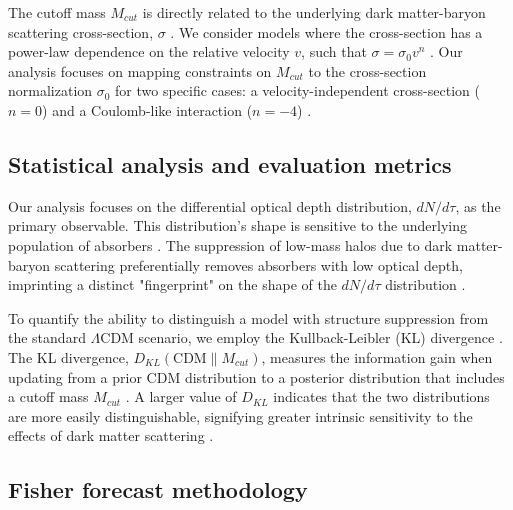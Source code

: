 \documentclass[]{article}
\begin{document}
The cutoff mass $M_{cut}$ is directly related to the underlying dark matter-baryon scattering cross-section, $\sigma$ . We consider models where the cross-section has a power-law dependence on the relative velocity $v$, such that $\sigma = \sigma_0 v^n$ \citep{Mahdawi_2018,Rahimieh_2025}. Our analysis focuses on mapping constraints on $M_{cut}$ to the cross-section normalization $\sigma_0$ for two specific cases: a velocity-independent cross-section ($n=0$) and a Coulomb-like interaction ($n=-4$) \citep{Mahdawi_2018,Rahimieh_2025}.

\subsection{Statistical analysis and evaluation metrics}

Our analysis focuses on the differential optical depth distribution, $dN/d\tau$, as the primary observable. This distribution's shape is sensitive to the underlying population of absorbers \citep{filipp2026lsststronglensingsystems}. The suppression of low-mass halos due to dark matter-baryon scattering preferentially removes absorbers with low optical depth, imprinting a distinct "fingerprint" on the shape of the $dN/d\tau$ distribution .

To quantify the ability to distinguish a model with structure suppression from the standard $\Lambda$CDM scenario, we employ the Kullback-Leibler (KL) divergence \citep{Hee_2016,herrera2026informationtheoreticastrophysicaluncertaintieseffective}. The KL divergence, $D_{KL}(\text{CDM} \parallel M_{cut})$, measures the information gain when updating from a prior CDM distribution to a posterior distribution that includes a cutoff mass $M_{cut}$ \citep{Hee_2016,herrera2026informationtheoreticastrophysicaluncertaintieseffective}. A larger value of $D_{KL}$ indicates that the two distributions are more easily distinguishable, signifying greater intrinsic sensitivity to the effects of dark matter scattering \citep{herrera2026informationtheoreticastrophysicaluncertaintieseffective}.

\subsection{Fisher forecast methodology}
\end{document}
